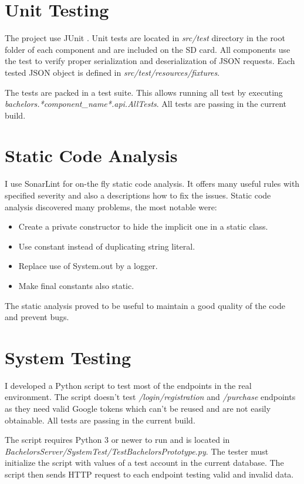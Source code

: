 \section{Unit Testing}
The project use JUnit \cite{junit}. Unit tests are located in \textit{src/test} directory in the root folder of each component and are included on the SD card. All components use the test to verify proper serialization and deserialization of JSON requests. Each tested JSON object is defined in \textit{src/test/resources/fixtures}.

The tests are packed in a test suite. This allows running all test by executing \textit{bachelors.*component\_name*.api.AllTests}. All tests are passing in the current build.

\section{Static Code Analysis}
I use SonarLint \cite{sonarlint} for on-the fly static code analysis. It offers many useful rules with specified severity and also a descriptions how to fix the issues. Static code analysis discovered many problems, the most notable were:
\begin{itemize}
	\item Create a private constructor to hide the implicit one in a static class.
	\item Use constant instead of duplicating string literal.
	\item Replace use of System.out by a logger.
	\item Make final constants also static.
\end{itemize}
The static analysis proved to be useful to maintain a good quality of the code and prevent bugs.

\section{System Testing}
I developed a Python script to test most of the endpoints in the real environment. The script doesn't test \textit{/login/registration} and \textit{/purchase} endpoints as they need valid Google tokens which can't be reused and are not easily obtainable. All tests are passing in the current build.

The script requires Python 3 or newer to run and is located in \textit{BachelorsServer/SystemTest/TestBachelorsPrototype.py}. The tester must initialize the script with values of a test account in the current database. The script then sends HTTP request to each endpoint testing valid and invalid data.


